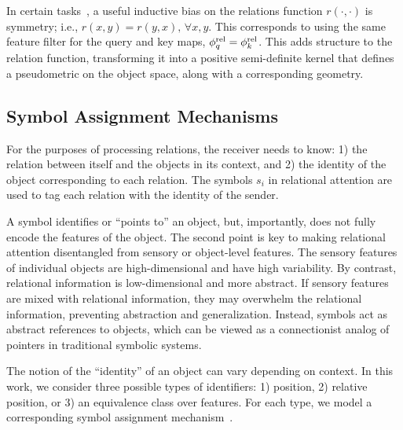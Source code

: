 In certain tasks~\citep{kergNeuralArchitectureInductive2022,altabaa2024abstractors,altabaaLearningHierarchicalRelational2024}, a useful inductive bias on the relations function $r(\cdot, \cdot)$ is symmetry; i.e., $r(x, y) = r(y, x),\, \forall x, y$. This corresponds to using the same feature filter for the query and key maps, $\phi_q^{\mathrm{rel}} = \phi_k^{\mathrm{rel}}$. This adds structure to the relation function, transforming it into a positive semi-definite kernel that defines a pseudometric on the object space, along with a corresponding geometry. %

\subsection{Symbol Assignment Mechanisms}

For the purposes of processing relations, the receiver needs to know: 1) the relation between itself and the objects in its context, and 2) the identity of the object corresponding to each relation.
The symbols $s_i$ in relational attention are used to tag each relation with the identity of the sender. %

A symbol identifies or ``points to'' an object, but, importantly, does not fully encode the features of the object. The second point is key to making relational attention disentangled from sensory or object-level features. The sensory features of individual objects are high-dimensional and have high variability. By contrast, relational information is low-dimensional and more abstract. If sensory features are mixed with relational information, they may overwhelm the relational information, preventing abstraction and generalization. Instead, symbols act as abstract references to objects, which can be viewed as a connectionist analog of pointers in traditional symbolic systems.

The notion of the ``identity'' of an object can vary depending on context. In this work, we consider three possible types of identifiers: 1) position, 2) relative position, or 3) an equivalence class over features. For each type, we model a corresponding symbol assignment mechanism~\citep{altabaa2024abstractors}.

